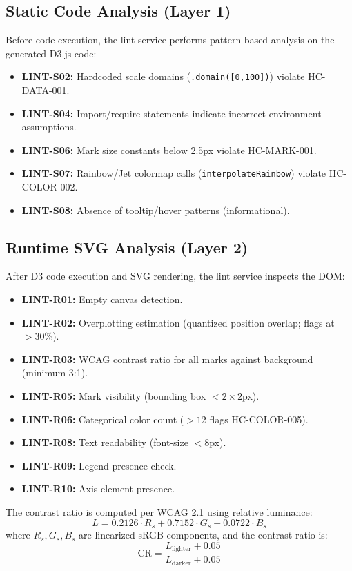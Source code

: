 \documentclass[final,5p,times,twocolumn]{elsarticle}
\begin{document}
\subsection{Static Code Analysis (Layer 1)}

Before code execution, the lint service performs pattern-based analysis on the generated D3.js code:

\begin{itemize}
  \item \textbf{LINT-S02:} Hardcoded scale domains (\texttt{.domain([0,100])}) violate HC-DATA-001.
  \item \textbf{LINT-S04:} Import/require statements indicate incorrect environment assumptions.
  \item \textbf{LINT-S06:} Mark size constants below 2.5px violate HC-MARK-001.
  \item \textbf{LINT-S07:} Rainbow/Jet colormap calls (\texttt{interpolateRainbow}) violate HC-COLOR-002.
  \item \textbf{LINT-S08:} Absence of tooltip/hover patterns (informational).
\end{itemize}

\subsection{Runtime SVG Analysis (Layer 2)}

After D3 code execution and SVG rendering, the lint service inspects the DOM:

\begin{itemize}
  \item \textbf{LINT-R01:} Empty canvas detection.
  \item \textbf{LINT-R02:} Overplotting estimation (quantized position overlap; flags at $>30\%$).
  \item \textbf{LINT-R03:} WCAG contrast ratio for all marks against background (minimum 3:1).
  \item \textbf{LINT-R05:} Mark visibility (bounding box $< 2\times 2$px).
  \item \textbf{LINT-R06:} Categorical color count ($>12$ flags HC-COLOR-005).
  \item \textbf{LINT-R08:} Text readability (font-size $< 8$px).
  \item \textbf{LINT-R09:} Legend presence check.
  \item \textbf{LINT-R10:} Axis element presence.
\end{itemize}

The contrast ratio is computed per WCAG 2.1 using relative luminance:
\begin{equation}
L = 0.2126 \cdot R_s + 0.7152 \cdot G_s + 0.0722 \cdot B_s
\end{equation}
where $R_s, G_s, B_s$ are linearized sRGB components, and the contrast ratio is:
\begin{equation}
\text{CR} = \frac{L_\text{lighter} + 0.05}{L_\text{darker} + 0.05}
\end{equation}
\end{document}
